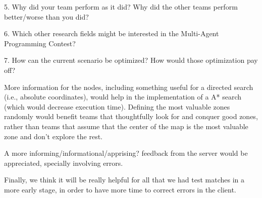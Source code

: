 5. Why did your team perform as it did? Why did the other teams perform
better/worse than you did?

6. Which other research fields might be interested in the Multi-Agent
Programming Contest?


7. How can the current scenario be optimized? How would those optimization pay
off?

    More information for the nodes, including something useful for a directed search (i.e., absolute coordinates), would help in
    the implementation of a A* search (which would decrease execution time). Defining the most valuable zones randomly would benefit teams that thoughtfully look for and conquer good zones, rather than teams that assume that the center of the map is the most valuable zone and don't explore the rest.

    A more informing/informational/apprising? feedback from the server would
    be appreciated, specially involving errors.

    Finally, we think it will be really helpful for all that we had test
    matches in a more early stage, in order to have more time to correct
    errors in the client.
